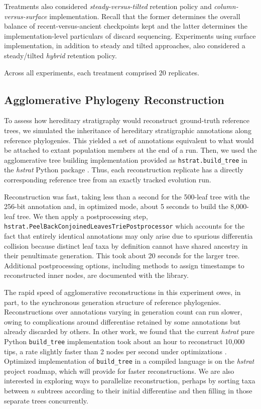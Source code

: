 Treatments also considered \textit{steady-versus-tilted} retention policy and \textit{column-versus-surface} implementation.
Recall that the former determines the overall balance of recent-versus-ancient checkpoints kept and the latter determines the implementation-level particulars of discard sequencing.
Experiments using surface implementation, in addition to steady and tilted approaches, also considered a steady/tilted \textit{hybrid} retention policy.

Across all experiments, each treatment comprised 20 replicates.

\subsection{Agglomerative Phylogeny Reconstruction}

To assess how hereditary stratigraphy would reconstruct ground-truth reference trees, we simulated the inheritance of hereditary stratigraphic annotations along reference phylogenies.
This yielded a set of annotations equivalent to what would be attached to extant population members at the end of a run.
Then, we used the agglomerative tree building implementation provided as \texttt{hstrat.build\_tree} in the \textit{hstrat} Python package \citep{moreno2022hstrat}.
Thus, each reconstruction replicate has a directly corresponding reference tree from an exactly tracked evolution run.

Reconstruction was fast, taking less than a second for the 500-leaf tree with the 256-bit annotation and, in optimized mode, about 5 seconds to build the 8,000-leaf tree.
We then apply a postprocessing step, \texttt{hstrat.{\allowbreak}Peel{\allowbreak}Back{\allowbreak}Conjoined{\allowbreak}Leave{\allowbreak}sTrie{\allowbreak}Postprocessor} which accounts for the fact that entirely identical annotations may only arise due to spurious differentia collision because distinct leaf taxa by definition cannot have shared ancestry in their penultimate generation.
This took about 20 seconds for the larger tree.
Additional postprocessing options, including methods to assign timestamps to reconstructed inner nodes, are documented with the library.

The rapid speed of agglomerative reconstructions in this experiment owes, in part, to the synchronous generation structure of reference phylogenies.
Reconstructions over annotations varying in generation count can run slower, owing to complications around differentiae retained by some annotations but already discarded by others.
In other work, we found that the current \textit{hstrat} pure Python \texttt{build\_tree} implementation took about an hour to reconstruct 10,000 tips, a rate slightly faster than 2 nodes per second under optimizations \citep{moreno2024trackable}.
Optimized implementation of \texttt{build\_tree} in a compiled language is on the \textit{hstrat} project roadmap, which will provide for faster reconstructions.
We are also interested in exploring ways to parallelize reconstruction, perhaps by sorting taxa between $n$ subtrees according to their initial differentiae and then filling in those separate trees concurrently.

